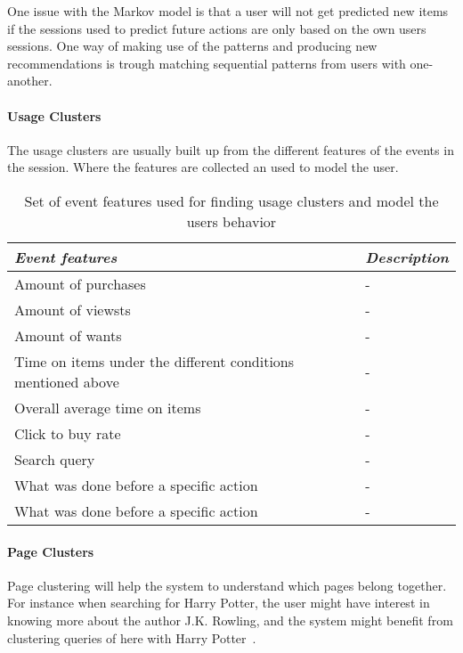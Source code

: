             One issue with the Markov model is that a user will not get predicted new items if the sessions used to predict future actions are only based on the own users sessions.
            One way of making use of the patterns and producing new recommendations is trough matching sequential patterns from users with one-another. 


        \paragraph{Usage Clusters} %
        \label{subp:usage_clusters}
            The usage clusters are usually built up from the different features of the events in the session.
            Where the features are collected an used to model the user.

            \begin{table}[H]
                \centering
                \begin{tabular}{l|l}
                    \emph{Event features} & \emph{Description} \\ \hline
                    Amount of purchases & - \\ \hline
                    Amount of viewsts & - \\ \hline
                    Amount of wants & - \\ \hline
                    Time on items under the different conditions mentioned above & -\\ \hline
                    Overall average time on items & - \\ \hline
                    Click to buy rate & - \\ \hline
                    Search query~\cite{Zhang:2006:MSE:1135777.1136004} & - \\ \hline
                    What was done before a specific action & - \\ \hline
                    What was done before a specific action & - \\
                \end{tabular}
                \caption[Event Features]{Set of event features used for finding usage clusters and model the users behavior}
                \label{table:uasageCluster}
            \end{table}

        \paragraph{Page Clusters} %
        \label{subp:page_clusters}
            Page clustering will help the system to understand which pages belong together.
            For instance when searching for Harry Potter, the user might have interest in knowing more about the author J.K. Rowling, and the system might benefit from clustering queries of here with Harry Potter~\cite{Zhang:2006:MSE:1135777.1136004}.

